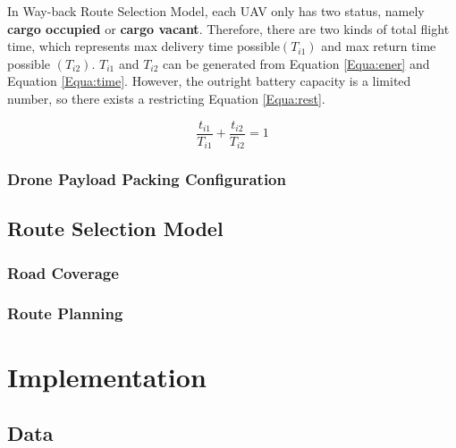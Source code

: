 \documentclass{mcmthesis}
\begin{document}
In Way-back Route Selection Model, each UAV only has two status, namely \textbf{cargo occupied} or \textbf{cargo vacant}. Therefore, there are two kinds of total flight time, which represents max delivery time possible$(T_{i1})$ and max return time possible $(T_{i2})$. $T_{i1}$ and $T_{i2}$ can be generated from Equation \ref{Equa:ener} and Equation \ref{Equa:time}. However, the outright battery capacity is a limited number, so there exists a restricting Equation \ref{Equa:rest}.

\begin{equation}\label{Equa:rest}
\frac{t_{i1}}{T_{i1}}+\frac{t_{i2}}{T_{i2}} = 1
\end{equation}


\subsubsection{Drone Payload Packing Configuration}




\subsection{Route Selection Model}














\subsubsection{Road Coverage}

\subsubsection{Route Planning}



\section{Implementation}

\subsection{Data}
\end{document}
